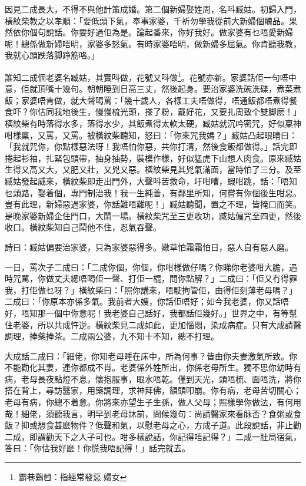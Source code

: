 \documentclass[a5paper, 12pt, openany]{book} %
\begin{document}
	因見二成長大，不得不與他計策成婚。第二個新婦娶姓周，名呌臧姑。初歸入門，橫紋柴教之以孝順：「要低頭下氣，奉事家婆，千祈勿學我從前大新婦個醜品。果然依你個句說話。你要好過佢為是。論起番來，你好我好。做家婆有乜唔愛新婦呢！總係做新婦唔明，家婆多怒氣。有時家婆唔明，做新婦多屈氣。你肯聽我教，我就心頭跌落脚踭筋咯。」

	誰知二成個老婆名臧姑，其實呌做，花號又呌做\footnote{霸巷鷄乸：指經常發惡󱝚婦女}。花號亦新。家婆話佢一句唔中意，佢就頂嘴十幾句。朝朝睡到日高三丈，然後起身。要治家婆洗碗洗碟，煮菜煮飯；家婆唔肯做，就大聲喝罵：「幾十歲人，各樣工夫唔做得，唔通飯都唔煮得餐食吓？你估同我地後生，慢慢梳光頭，搽了粉，戴好花，又要扎周致个雙脚麽！」橫紋柴有時落得水多，落得水少，其飯煮得太軟太硬，臧姑就沉吟密咒，好似稟神咁樣稟，又罵，又罵。被橫紋柴聽知，怒曰：「你來咒我媽？」臧姑凸起眼睛曰：「我就咒你，你點樣惡法呀！我唔怕你惡，共你打清，然後食飯都做得。」話完即捲起衫袖，扎緊包頭帶，抽身抽勢，裝模作樣，好似猛虎下山想人肉食。原來臧姑生得又高又大，又肥又壯，又兇又惡。橫紋柴見其兇氣滿面，當時怕了三分。及至臧姑發起威來，橫紋柴即走出門外，大聲呌苦救命，圩咁嘈，蝦咁跳，話：「唔知乜頭路，娶着個，專門制治我！我一生純善，有鄰里所知，何嘗有你個後生咁惡。豈有此理，新婦惡過家婆，你話難唔難呢！」臧姑聽聞，置之不理，皆掩口而笑。是晚家婆新婦企住門口，大鬧一場。橫紋柴咒至三更收功，臧姑偏咒至四更，然後收口。橫紋柴知自己鬦他不住，忍氣吞聲。

	詩曰：臧姑偏要治家婆，只為家婆惡得多。嫩草怕霜霜怕日，惡人自有惡人磨。

	一日，罵次子二成曰：「二成你個，你個，你咁樣做仔嗎？你睇你老婆咁大膽，遇時咒駡，你做丈夫總唔喝佢一聲、打佢一棍，問你點解？」二成曰：「佢又冇得罪我，打佢做乜呀？」橫紋柴曰：「照你講來，唔駛拘管佢，由得佢刻薄老母嗎？」二成曰：「你原本亦係多氣。我前者大嫂，你話佢唔好；如今我老婆，你又話唔好，唔知那一個中你意呢！我老婆自己話好，我都話佢幾好。」世界之中，有等幫住老婆，所以共成忤逆。橫紋柴見二成如此，更加惱悶，染成病症。只有大成請醫調理，捧藥捧茶。二成兩公婆，九不知十不知，總不打理。

	大成話二成曰：「細佬，你知老母睡在床中，所為何事？皆由你夫妻激氣所致。你不能勸化其妻，連你都成不肖。老婆係外姓所出，你係老母所生。獨不思你幼時有病，老母長夜點燈不息，懷抱服事，眼水唔乾。僅到天光，頭唔梳、面唔洗，將你搭在背上，尋訪醫家，用藥調理，求神拜佛，額頭叩崩。你有病，老母苦切關心；老母有病，你總不着意。你將來亦望生子生孫，做人父母；照樣學你做法，有何用哉！細佬，須聽我言，明早到老母牀前，問候幾句：尚請醫家來看脉否？食粥或食飯？抑或想食甚麽物件？低聲和氣，以慰老母之心，方成子道。此段說話，非止勸二成，即謂勸天下之人子可也。咁多樣說話，你記得唔記得？」二成一肚局宿氣，答曰：「你估我好麽！你慌我唔記得！」話完就去。
\end{document}
